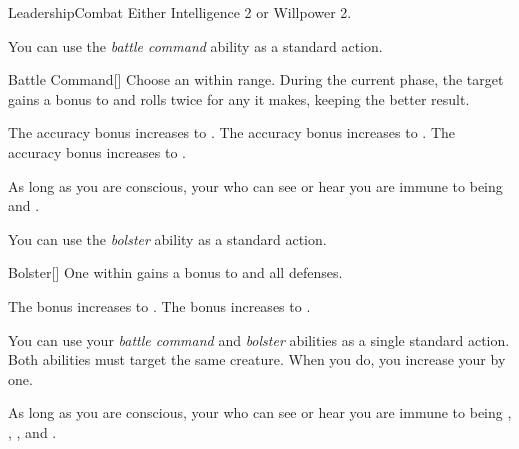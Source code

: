     \begin{feat}{Leadership}{Combat}
        \featpre Either Intelligence 2 or Willpower 2.

         You can use the \textit{battle command} ability as a standard action.
        \begin{activeability}{Battle Command}[]
            \rankline
            Choose an  within \rngmed range.
            During the current phase, the target gains a  bonus to  and rolls twice for any  it makes, keeping the better result.

            \rankline
             The accuracy bonus increases to .
             The accuracy bonus increases to .
             The accuracy bonus increases to .
        \end{activeability}

         As long as you are conscious, your  who can see or hear you are immune to being \shaken and \frightened.

         You can use the \textit{bolster} ability as a standard action.
        \begin{activeability}{Bolster}[]
            \rankline
            One  within \medrange {} gains a  bonus to  and all defenses.

            \rankline
             The bonus increases to .
             The bonus increases to .
        \end{activeability}

         You can use your \textit{battle command} and \textit{bolster} abilities as a single standard action.
        Both abilities must target the same creature.
        When you do, you increase your  by one.

         As long as you are conscious, your  who can see or hear you are immune to being \dazed, \stunned, \confused, and \panicked.
    \end{feat}

